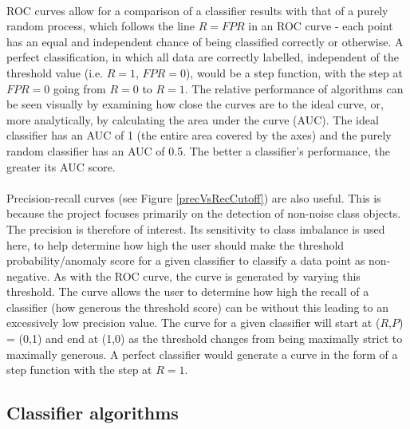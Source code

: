 \documentclass[12pt]{article}
\begin{document}
\paragraph{}
ROC curves allow for a comparison of a classifier results with that of a purely random process, which follows the line $R = FPR$ in an ROC curve - each point has an equal and independent chance of being classified correctly or otherwise. A perfect classification, in which all data are correctly labelled, independent of the threshold value (i.e. $R = 1$, $FPR = 0$), would be a step function, with the step at $FPR = 0$ going from $R = 0$ to $R = 1$. The relative performance of algorithms can be seen visually by examining how close the curves are to the ideal curve, or, more analytically, by calculating the area under the curve (AUC). The ideal classifier has an AUC of 1 (the entire area covered by the axes) and the purely random classifier has an AUC of 0.5. The better a classifier's performance, the greater its AUC score.
\paragraph{}
Precision-recall curves (see Figure \ref{precVsRecCutoff}) are also useful. This is because the project focuses primarily on the detection of non-noise class objects. The precision is therefore of interest. Its sensitivity to class imbalance is used here, to help determine how high the user should make the threshold probability/anomaly score for a given classifier to classify a data point as non-negative. As with the ROC curve, the curve is generated by varying this threshold. The curve allows the user to determine how high the recall of a classifier (how generous the threshold score) can be without this leading to an excessively low precision value. The curve for a given classifier will start at ($R$,$P$) = (0,1) and end at (1,0) as the threshold changes from being maximally strict to maximally generous. A perfect classifier would generate a curve in the form of a step function with the step at $R=1$.

\subsection{Classifier algorithms}
\end{document}
